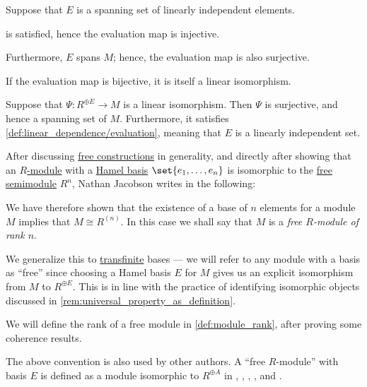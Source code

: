 \begin{defproof}
   Suppose that \( E \) is a spanning set of linearly independent elements.

   is satisfied, hence the evaluation map is injective.

  Furthermore, \( E \) spans \( M \); hence, the evaluation map is also surjective.

   If the evaluation map is bijective, it is itself a linear isomorphism.

   Suppose that \( \Psi: R^{\oplus E} \to M \) is a linear isomorphism. Then \( \Psi \) is surjective, and hence a spanning set of \( M \). Furthermore, it satisfies \cref{def:linear_dependence/evaluation}, meaning that \( E \) is a linearly independent set.
\end{defproof}

\begin{remark}\label{rem:free_module}
  After discussing \hyperref[con:free_construction]{free constructions} in generality, and directly after showing that an \hyperref[def:module]{\( R \)-module} with a \hyperref[def:hamel_basis]{Hamel basis} \( \set{ e_1, \ldots, e_n } \)  is isomorphic to the \hyperref[def:free_semimodule]{free semimodule} \( R^n \), Nathan Jacobson writes in \cite[171]{Jacobson1985BasicAlgebraI} the following:
  \begin{displayquote}
    We have therefore shown that the existence of a base of \( n \) elements for a module \( M \) implies that \( M \cong R^{(n)} \). In this case we shall say that \( M \) is a \textit{free \( R \)-module of rank \( n \)}.
  \end{displayquote}

  We generalize this to \hyperref[con:transfinitum]{transfinite} bases --- we will refer to any module with a basis as \enquote{free} since choosing a Hamel basis \( E \) for \( M \) gives us an explicit isomorphism from \( M \) to \( R^{\oplus E} \). This is in line with the practice of identifying isomorphic objects discussed in \cref{rem:universal_property_as_definition}.

  We will define the rank of a free module in \cref{def:module_rank}, after proving some coherence results.
\end{remark}
\begin{comments}
  \item The above convention is also used by other authors. A \enquote{free \( R \)-module} with basis \( E \) is defined as a module isomorphic to \( R^{\oplus A} \) in
  \cite[def. II.1.10]{Bourbaki1998Algebra1to3},
  \cite[135]{Lang2002Algebra},
  \cite[329]{Rotman2015AdvancedModernAlgebraPart1},
  \cite[169]{Aluffi2009Algebra},
  \cite[405]{Knapp2016BasicAlgebra} and
  \cite[47]{Шафаревич2019ОсновныеПонятияАлгебры}.
\end{comments}


